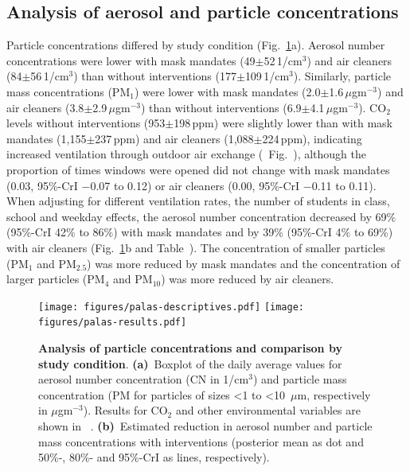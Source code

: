 \documentclass[fleqn,11pt]{wlscirep}
\begin{document}
\subsection{Analysis of aerosol and particle concentrations}

Particle concentrations differed by study condition (Fig.~\ref{fig:palas-results}a). Aerosol number concentrations were lower with mask mandates (49$\pm$52\,1/cm$^3$) and air cleaners (84$\pm$56\,1/cm$^3$) than without interventions (177$\pm$109\,1/cm$^3$). Similarly, particle mass concentrations (\eg PM$_1$) were lower with mask mandates (2.0$\pm$1.6\,$\mu$gm$^{-3}$) and air cleaners (3.8$\pm$2.9\,$\mu$gm$^{-3}$) than without interventions (6.9$\pm$4.1\,$\mu$gm$^{-3}$). CO$_2$ levels without interventions (953$\pm$198\,ppm) were slightly lower than with mask mandates (1,155$\pm$237\,ppm) and air cleaners (1,088$\pm$224\,ppm), indicating increased ventilation through outdoor air exchange (\supp~Fig.~), although the proportion of times windows were opened did not change with mask mandates (0.03, 95\%-CrI $-$0.07 to 0.12) or air cleaners (0.00, 95\%-CrI $-$0.11 to 0.11). When adjusting for different ventilation rates, the number of students in class, school and weekday effects, the aerosol number concentration decreased by 69\% (95\%-CrI 42\% to 86\%) with mask mandates and by 39\% (95\%-CrI 4\% to 69\%) with air cleaners (Fig.~\ref{fig:palas-results}b and Table~). The concentration of smaller particles (PM$_1$ and PM$_{2.5}$) was more reduced by mask mandates and the concentration of larger particles (PM$_4$ and PM$_{10}$) was more reduced by air cleaners. 

\begin{figure}[!htpb]
\centering
    \texttt{[image: figures/palas-descriptives.pdf]}
    \texttt{[image: figures/palas-results.pdf]}
    \caption{\textbf{Analysis of particle concentrations and comparison by study condition}. \textbf{(a)}~Boxplot of the daily average values for aerosol number concentration (CN in 1/cm$^3$) and particle mass concentration (PM for particles of sizes <1 to <10~$\mu$m, respectively in $\mu$gm$^{-3}$). Results for CO$_2$ and other environmental variables are shown in \supp~. \textbf{(b)}~Estimated reduction in aerosol number and particle mass concentrations with interventions (posterior mean as dot and 50\%-, 80\%- and 95\%-CrI as lines, respectively). }
    \label{fig:palas-results}
\end{figure}
\end{document}
